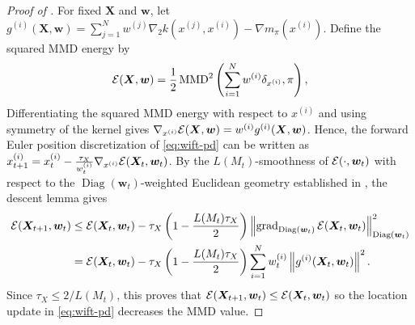 \begin{proof}[Proof of ]
For fixed $\bm{X}$ and $\bm{w}$, let
$g^{(i)}(\bm{X},\bm{w})=\sum_{j=1}^N w^{(j)}\nabla_2 k(x^{(j)},x^{(i)})-\nabla m_\pi(x^{(i)})$.
Define the squared MMD energy by
\begin{align}\label{eq:defi_mmd}
\mathcal{E}(\bm{X},\bm{w})
=\frac12\operatorname{MMD}^2\left(\sum_{i=1}^N w^{(i)}\delta_{x^{(i)}},\pi\right),
\end{align}
Differentiating the squared MMD energy with respect to $x^{(i)}$ and using symmetry of the kernel gives
$\nabla_{x^{(i)}}\mathcal{E}(\bm{X},\bm{w})=w^{(i)} g^{(i)}(\bm{X},\bm{w})$.
Hence, the forward Euler position discretization of \eqref{eq:wift-pd} can be written as $x_{t+1}^{(i)}=x_t^{(i)}-\frac{\tau_X}{w_t^{(i)}} \nabla_{x^{(i)}}\mathcal{E}(\bm{X}_t,\bm{w}_t)$.
By the $L(M_t)$-smoothness of $\mathcal{E}(\cdot,\bm{w}_t)$ with respect to the $\operatorname{Diag}(\bm{w}_t)$-weighted Euclidean geometry established in , the descent lemma gives
\begin{align}
\mathcal{E}(\bm{X}_{t+1},\bm{w}_t)
&\leq \mathcal{E}(\bm{X}_t,\bm{w}_t)
-\tau_X\left(1-\frac{L(M_t)\tau_X}{2}\right)
\left\|\operatorname{grad}_{\operatorname{Diag}(\bm{w}_t)}
\mathcal{E}(\bm{X}_t,\bm{w}_t)\right\|_{\operatorname{Diag}(\bm{w}_t)}^2
\nonumber \\
&= \mathcal{E}(\bm{X}_t,\bm{w}_t) - \tau_X \left(1 - \frac{L(M_t)\tau_X}{2} \right) \sum_{i=1}^N
 w_t^{(i)} \left\| g^{(i)}(\bm{X}_t,\bm{w}_t)
\right\|^2.
\label{eq:wasserstein-descent}
\end{align}
Since $\tau_X\leq2/L(M_t)$, this proves that $\mathcal{E}(\bm{X}_{t+1},\bm{w}_t)\leq\mathcal{E}(\bm{X}_t,\bm{w}_t)$ so the location update in \eqref{eq:wift-pd} decreases the MMD value.


\end{proof}
